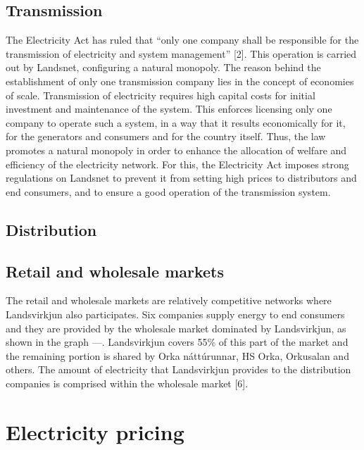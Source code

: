\documentclass[svn, final]{rureport}
\begin{document}
\subsection{Transmission}

The Electricity Act has ruled that “only one company shall be responsible for the transmission of electricity and system management” [2]. This operation is carried out by Landsnet, configuring a natural monopoly. The reason behind the establishment of only one transmission company lies in the concept of economies of scale. Transmission of electricity requires high capital costs for initial investment and maintenance of the system. This enforces licensing only one company to operate such a system, in a way that it results economically for it, for the generators and consumers and for the country itself. Thus, the law promotes a natural monopoly in order to enhance the allocation of welfare and efficiency of the electricity network. For this, the Electricity Act imposes strong regulations on Landsnet to prevent it from setting high prices to distributors and end consumers, and to ensure a good operation of the transmission system. 

\subsection{Distribution}

\subsection{Retail and wholesale markets}

The retail and wholesale markets are relatively competitive networks where Landsvirkjun also participates. Six companies supply energy to end consumers and they are provided by the wholesale market dominated by Landsvirkjun, as shown in the graph ---. Landsvirkjun covers 55\% of this part of the market and the remaining portion is shared by Orka náttúrunnar, HS Orka, Orkusalan and others. The amount of electricity that Landsvirkjun provides to the distribution companies is comprised within the wholesale market [6].


\section{Electricity pricing}
\end{document}
